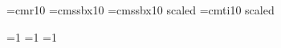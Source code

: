 
\font\mainfont=cmr10
\font\chheadfont=cmssbx10
\font\bkheadfont=cmssbx10 scaled 
\font\titlefont=cmti10 scaled 

=1
=1
=1

\def\ejtoodd#1{\ifodd\count0\null\break\eject\null\break\eject\else\null\break\eject\fi}

\def\title#1{\centerline{\titlefont #1}\vskip 26pt \centerline{\bkheadfont \versionname}\eject}

\def\version#1{\def\versionname{The #1 Version}}

\def\testament#1{\ejtoodd{}\rightline{\titlefont The #1 Testament}\eject\count12=1}

\def\book#1{}

\def\chapter#1{}

\def\verse{$ ^{\number\count11} $\advance\count11 by 1}

\def\emph#1{}

